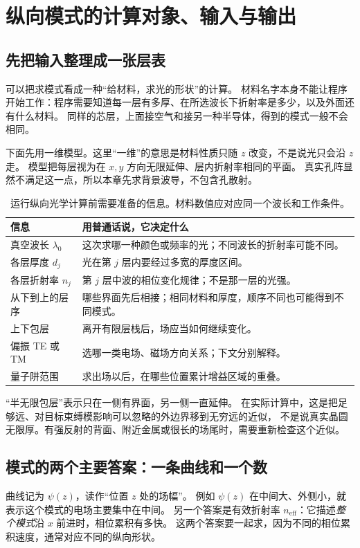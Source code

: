 \section{纵向模式的计算对象、输入与输出}
\label{sec:vertical-mode-inputs}
\subsection{先把输入整理成一张层表}
可以把求模式看成一种“给材料，求光的形状”的计算。
材料名字本身不能让程序开始工作：程序需要知道每一层有多厚、在所选波长下折射率是多少，以及外面还有什么材料。
同样的芯层，上面接空气和接另一种半导体，得到的模式一般不会相同。

下面先用一维模型。这里“一维”的意思是材料性质只随 $z$ 改变，不是说光只会沿 $z$ 走。
模型把每层视为在 $x,y$ 方向无限延伸、层内折射率相同的平面。
真实孔阵显然不满足这一点，所以本章先求背景波导，不包含孔散射。

\begin{table}[htbp]
\centering
\caption{运行纵向光学计算前需要准备的信息。材料数值应对应同一个波长和工作条件。}
\label{tab:vertical-input-checklist}
\begin{tabularx}{\textwidth}{@{}p{}Y@{}}
\toprule
信息 & 用普通话说，它决定什么\\
\midrule
真空波长 $\lambda_0$ & 这次求哪一种颜色或频率的光；不同波长的折射率可能不同。\\
各层厚度 $d_j$ & 光在第 $j$ 层内要经过多宽的厚度区间。\\
各层折射率 $n_j$ & 第 $j$ 层中波的相位变化规律；不是那一层的光强。\\
从下到上的层序 & 哪些界面先后相接；相同材料和厚度，顺序不同也可能得到不同模式。\\
上下包层 & 离开有限层栈后，场应当如何继续变化。\\
偏振 TE 或 TM & 选哪一类电场、磁场方向关系；下文分别解释。\\
量子阱范围 & 求出场以后，在哪些位置累计增益区域的重叠。\\
\bottomrule
\end{tabularx}
\end{table}

“半无限包层”表示只在一侧有界面，另一侧一直延伸。
在实际计算中，这是把足够远、对目标束缚模影响可以忽略的外边界移到无穷远的近似，
不是说真实晶圆无限厚。有强反射的背面、附近金属或很长的场尾时，需要重新检查这个近似。

\subsection{模式的两个主要答案：一条曲线和一个数}
曲线记为 $\psi(z)$，读作“位置 $z$ 处的场幅”。
例如 $\psi(z)$ 在中间大、外侧小，就表示这个模式的电场主要集中在中间。
另一个答案是有效折射率 $n_{\mathrm{eff}}$：它描述\emph{整个模式}沿 $x$ 前进时，相位累积有多快。
这两个答案要一起求，因为不同的相位累积速度，通常对应不同的纵向形状。

